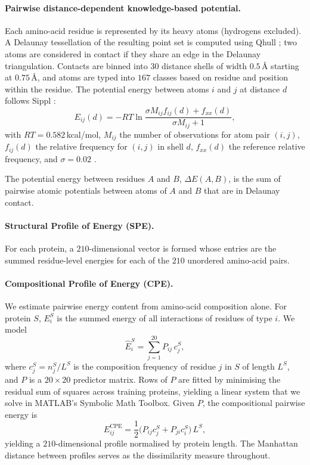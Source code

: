 \documentclass[11pt]{article}
\begin{document}
\paragraph{Pairwise distance-dependent knowledge-based potential.} Each amino-acid residue is represented by its heavy atoms (hydrogens excluded). A Delaunay tessellation \cite{singh1996delaunay} of the resulting point set is computed using Qhull \cite{barber1996qhull}; two atoms are considered in contact if they share an edge in the Delaunay triangulation. Contacts are binned into $30$ distance shells of width $0.5$\,{\AA} starting at $0.75$\,{\AA}, and atoms are typed into $167$ classes based on residue and position within the residue. The potential energy between atoms $i$ and $j$ at distance $d$ follows Sippl \cite{sippl1990}:
\begin{equation}
E_{ij}(d) = -RT \ln \frac{\sigma M_{ij} f_{ij}(d) + f_{xx}(d)}{\sigma M_{ij} + 1},
\end{equation}
with $RT = 0.582$\,kcal/mol, $M_{ij}$ the number of observations for atom pair $(i,j)$, $f_{ij}(d)$ the relative frequency for $(i,j)$ in shell $d$, $f_{xx}(d)$ the reference relative frequency, and $\sigma = 0.02$ \cite{sippl1990}.

The potential energy between residues $A$ and $B$, $\Delta E(A,B)$, is the sum of pairwise atomic potentials between atoms of $A$ and $B$ that are in Delaunay contact.

\paragraph{Structural Profile of Energy (SPE).} For each protein, a $210$-dimensional vector is formed whose entries are the summed residue-level energies for each of the $210$ unordered amino-acid pairs.

\paragraph{Compositional Profile of Energy (CPE).} We estimate pairwise energy content from amino-acid composition alone. For protein $S$, $E_i^S$ is the summed energy of all interactions of residues of type $i$. We model
\begin{equation}
\widehat{E}_i^S = \sum_{j=1}^{20} P_{ij}\, c_j^S,
\end{equation}
where $c_j^S = n_j^S / L^S$ is the composition frequency of residue $j$ in $S$ of length $L^S$, and $P$ is a $20\times 20$ predictor matrix. Rows of $P$ are fitted by minimising the residual sum of squares across training proteins, yielding a linear system that we solve in MATLAB's Symbolic Math Toolbox. Given $P$, the compositional pairwise energy is
\begin{equation}
E_{ij}^{\mathrm{CPE}} = \frac{1}{2}\bigl(P_{ij} c_j^S + P_{ji} c_i^S\bigr)\, L^S,
\end{equation}
yielding a $210$-dimensional profile normalised by protein length. The Manhattan distance between profiles serves as the dissimilarity measure throughout.
\end{document}
